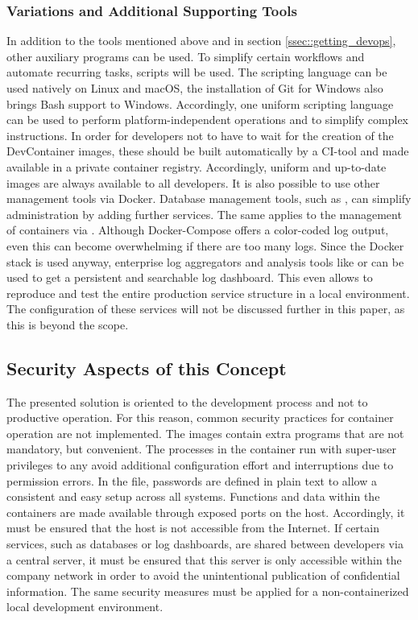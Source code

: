        \subsubsection{Variations and Additional Supporting Tools}
        In addition to the tools mentioned above and in section \ref{ssec::getting_devops}, other auxiliary programs can be used. To simplify certain workflows and automate recurring tasks, scripts will be used. The scripting language  can be used natively on Linux and macOS, the installation of Git for Windows also brings Bash support to Windows. Accordingly, one uniform scripting language can be used to perform platform-independent operations and to simplify complex instructions. In order for developers not to have to wait for the creation of the DevContainer images, these should be built automatically by a \ac{CI}-tool and made available in a private container registry. Accordingly, uniform and up-to-date images are always available to all developers. \newline
        It is also possible to use other management tools via Docker. Database management tools, such as , can simplify administration by adding further services. The same applies to the management of containers via . Although Docker-Compose offers a color-coded log output, even this can become overwhelming if there are too many logs. Since the Docker stack is used anyway, enterprise log aggregators and analysis tools like  or  can be used to get a persistent and searchable log dashboard. This even allows to reproduce and test the entire production service structure in a local environment. The configuration of these services will not be discussed further in this paper, as this is beyond the scope.

    \subsection{Security Aspects of this Concept}\label{ssec::sec}
    The presented solution is oriented to the development process and not to productive operation. For this reason, common security practices for container operation are not implemented. The images contain extra programs that are not mandatory, but convenient. The processes in the container run with super-user privileges to any avoid additional configuration effort and interruptions due to permission errors. In the  file, passwords are defined in plain text to allow a consistent and easy setup across all systems. Functions and data within the containers are made available through exposed ports on the host. Accordingly, it must be ensured that the host is not accessible from the Internet. If certain services, such as databases or log dashboards, are shared between developers via a central server, it must be ensured that this server is only accessible within the company network in order to avoid the unintentional publication of confidential information. The same security measures must be applied for a non-containerized local development environment.

